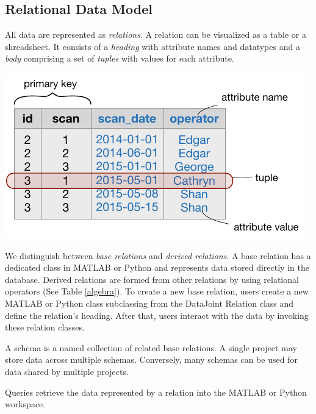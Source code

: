 \begin{table}
\begin{boxedminipage}{\textwidth}
\section*{Relational Data Model}
\begin{description}
\setlength\itemsep{6pt}
\item[Relation] 
All data are represented as \emph{relations}.  A relation can be visualized as a table or a shreadsheet.  
It consists of a \emph{heading} with attribute names and datatypes and a \emph{body} comprising a set of \emph{tuples} with values for each attribute.

\begin{center}
\includegraphics{./figures/relation.pdf}
\end{center}

We distinguish between \emph{base relations} and \emph{derived relations}.  
A base relation has a dedicated class in MATLAB or Python and represents data stored directly in the database.
Derived relations are formed from other relations by using relational operators (See Table \ref{algebra}).
To create a new base relation, users create a new MATLAB or Python class subclassing from the DataJoint Relation class and define the relation's heading. 
After that, users interact with the data by invoking these relation classes.

\item[Schema] A schema is a named collection of related base relations. 
A single project may store data across multiple schemas. Conversely, many schemas can be used for data shared by multiple projects.

\item[Query] Queries retrieve the data represented by a relation into the MATLAB or Python workspace.


\end{description}
\end{boxedminipage}
\end{table}
